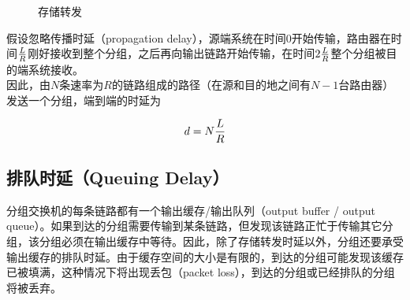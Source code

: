 \begin{figure}[H]
    \centering
    \caption{存储转发}
\end{figure}

假设忽略传播时延（propagation delay），源端系统在时间0开始传输，路由器在时间$ L \over R $刚好接收到整个分组，之后再向输出链路开始传输，在时间$ 2 {L \over R} $整个分组被目的端系统接收。\\

因此，由$ N $条速率为$ R $的链路组成的路径（在源和目的地之间有$ N - 1 $台路由器）发送一个分组，端到端的时延为

\vspace{-0.5cm}

\begin{align}
    d = N {L \over R}
\end{align}

\vspace{0.5cm}

\subsection{排队时延（Queuing Delay）}

分组交换机的每条链路都有一个输出缓存/输出队列（output buffer / output queue）。如果到达的分组需要传输到某条链路，但发现该链路正忙于传输其它分组，该分组必须在输出缓存中等待。因此，除了存储转发时延以外，分组还要承受输出缓存的排队时延。由于缓存空间的大小是有限的，到达的分组可能发现该缓存已被填满，这种情况下将出现丢包（packet loss），到达的分组或已经排队的分组将被丢弃。\\

